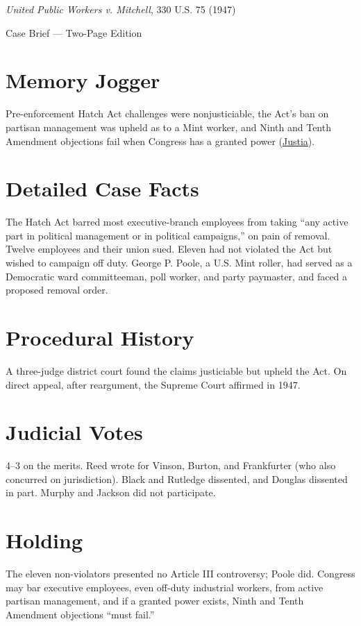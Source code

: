 \documentclass[12pt]{article}
\begin{document}
\begin{center}
{\LARGE \textit{United Public Workers v. Mitchell}, 330 U.S. 75 (1947)\par}
\vspace{0.5em}
{\large Case Brief --- Two-Page Edition\par}
\end{center}

\section{Memory Jogger}
Pre-enforcement Hatch Act challenges were nonjusticiable, the Act's ban on partisan management was upheld as to a Mint worker, and Ninth and Tenth Amendment objections fail when Congress has a granted power (\href{https://supreme.justia.com/cases/federal/us/330/75/}{Justia}).

\section{Detailed Case Facts}
The Hatch Act barred most executive-branch employees from taking ``any active part in political management or in political campaigns,'' on pain of removal. Twelve employees and their union sued. Eleven had not violated the Act but wished to campaign off duty. George P. Poole, a U.S. Mint roller, had served as a Democratic ward committeeman, poll worker, and party paymaster, and faced a proposed removal order.

\section{Procedural History}
A three-judge district court found the claims justiciable but upheld the Act. On direct appeal, after reargument, the Supreme Court affirmed in 1947.

\section{Judicial Votes}
4--3 on the merits. Reed wrote for Vinson, Burton, and Frankfurter (who also concurred on jurisdiction). Black and Rutledge dissented, and Douglas dissented in part. Murphy and Jackson did not participate.

\section{Holding}
The eleven non-violators presented no Article III controversy; Poole did. Congress may bar executive employees, even off-duty industrial workers, from active partisan management, and if a granted power exists, Ninth and Tenth Amendment objections ``must fail.''
\end{document}
